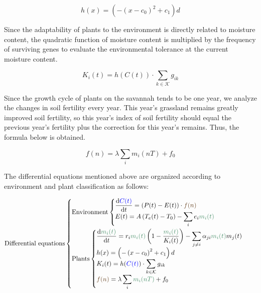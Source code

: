 \documentclass{mcmthesis}
\begin{document}
\begin{equation}
h(x)=\left(-\left(x-c_0\right)^2+c_1\right) d
\end{equation}

Since the adaptability of plants to the environment is directly related to moisture content, the quadratic function of moisture content is multiplied by the frequency of surviving genes to evaluate the environmental tolerance at the current moisture content.

\begin{equation}
K_i(t)=h(C(t)) \cdot \sum_{k \in \mathcal{K}} g_{i k}
\end{equation}

Since the growth cycle of plants on the savannah tends to be one year, we analyze the changes in soil fertility every year. This year's grassland remains greatly improved soil fertility, so this year's index of soil fertility should equal the previous year's fertility plus the correction for this year's remains. Thus, the formula below is obtained.

\begin{equation}
f(n)=\lambda \sum_i m_i(n T)+f_0
\end{equation}


The differential equations mentioned above are organized according to environment and plant classification as follows:

$$
\mathrm{Differential\ equations}
\begin{cases}
\begin{aligned}  
&\mathrm{Environment}
\begin{cases}
\begin{aligned}
&\dfrac{\mathrm{d}\textcolor{blue}{C(t)}}{\mathrm{d} t}=(P(t)-E(t))\cdot \textcolor[rgb]{0.4, 0.26, 0.13}{f(n)} \\
&E(t)=A\left(T_e(t)-T_0\right)-\displaystyle\sum_i e_i \textcolor[rgb]{0.282, 0.561, 0.412}{m_i(t)} \\ 
\end{aligned} 
\end{cases}\\
&\mathrm{Plants}
\begin{cases}
\begin{aligned} 
&\dfrac{\mathrm{d} \textcolor[rgb]{0.282, 0.561, 0.412}{m_i(t)}}{\mathrm{d} t}=r_i \textcolor[rgb]{0.282, 0.561, 0.412}{m_i(t)}\left(1-\dfrac{\textcolor[rgb]{0.282, 0.561, 0.412}{m_i(t)}}{K_i(t)}\right)-\displaystyle\sum_{j\neq i} \alpha_{j i} \textcolor[rgb]{0.282, 0.561, 0.412}{m_i(t)}m_j(t) \\ 
&h(x)=\left(-\left(x-c_0\right)^2+c_1\right) d\\
&K_i(t)=h(\textcolor{blue}{C(t)}) \cdot \sum_{k \in \mathcal{K}} g_{i k} \\
&\textcolor[rgb]{0.4, 0.26, 0.13}{f(n)}=\lambda \sum_{i} \textcolor[rgb]{0.282, 0.561, 0.412}{m_i(n T)}+f_0
\end{aligned} 
\end{cases}
\end{aligned}
\end{cases}
$$
\end{document}
